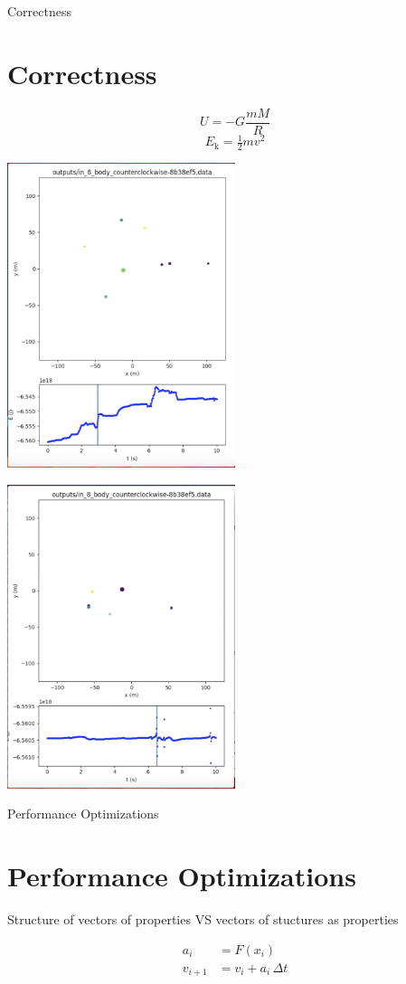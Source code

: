 \documentclass{beamer}
\begin{document}
\begin{frame}[allowframebreaks]{Correctness}
\section{Correctness}
\[
U = -G\frac {mM}{R}
\]
\[
E_\text{k} =\tfrac{1}{2} mv^2 
\]

\includegraphics[width=0.5\textwidth]{barnes_hut}

\framebreak

\includegraphics[width=0.5\textwidth]{energy_anomaly}
\end{frame}

\begin{frame}[allowframebreaks]{Performance Optimizations}
\section{Performance Optimizations}

Structure of vectors of properties VS vectors of stuctures as properties

\framebreak

\begin{align*}
a_{i}&=F(x_{i})\\
v_{i+1}&=v_{i}+a_{i}\,\Delta t
\end{align*}

\end{frame}
\end{document}
